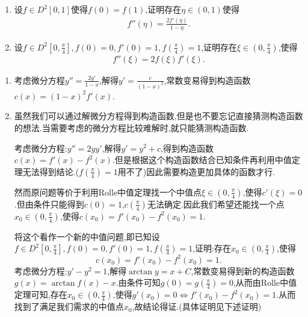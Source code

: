 \documentclass[../../main.tex]{subfiles}%
\begin{document}
\begin{example}
\begin{enumerate}
\item 设\(f\in D^{2}[0,1]\)使得\(f(0)=f(1)\),证明存在\(\eta\in(0,1)\)使得
\begin{align*}
f''(\eta)=\frac{2f'(\eta)}{1 - \eta}.
\end{align*}

\item 设\(f\in D^{2}[0,\frac{\pi}{4}],f(0)=0,f'(0)=1,f(\frac{\pi}{4})=1\),证明存在\(\xi\in(0,\frac{\pi}{4})\),使得
\begin{align*}
f''(\xi)=2f(\xi)f'(\xi).
\end{align*}
\end{enumerate} 
\end{example}
\begin{remark}
\begin{enumerate}
\item 考虑微分方程\(y'' =\frac{2y'}{1-x}\),解得\(y' =\frac{c}{(1 - x)^2}\),常数变易得到构造函数\(c(x)=(1 - x)^2f'(x)\).

\item 虽然我们可以通过解微分方程得到构造函数,但是也不要忘记直接猜测构造函数的想法.当需要考虑的微分方程比较难解时,就只能猜测构造函数. 

考虑微分方程:$y''=2yy'$,解得$y'=y^2+c$,得到构造函数$c(x)=f'(x)-f^2(x)$.但是根据这个构造函数结合已知条件再利用中值定理无法得到结论.($f(\frac{\pi}{4})=1$用不了)因此需要构造更加具体的函数才行.

然而原问题等价于利用Rolle中值定理找一个中值点$\xi\in (0,\frac{\pi }{4})$,使得$c'(\xi)=0$.但由条件只能得到$c(0)=1$,$c(\frac{\pi}{4})$无法确定.因此我们希望还能找一个点$x_0\in(0,\frac{\pi }{4})$,使得$c(x_0)=f'(x_0)-f^2(x_0)=1$.

将这个看作一个新的中值问题,即已知设\(f\in D^{2}[0,\frac{\pi}{4}],f(0)=0,f'(0)=1,f(\frac{\pi}{4})=1\),证明:存在$x_0\in(0,\frac{\pi }{4})$,使得\[c(x_0)=f'(x_0)-f^2(x_0)=1.\]
考虑微分方程:$y'-y^2=1$,解得$\arctan y=x+C$,常数变易得到新的构造函数$g(x)=\arctan f(x)-x$.由条件可知$g(0)=g(\frac{\pi}{4})=0$,从而由Rolle中值定理可知,存在$x_0\in(0,\frac{\pi}{4})$,使得$g'(x_0)=0\Leftrightarrow f'(x_0)-f^2(x_0)=1$.从而找到了满足我们需求的中值点$x_0$,故结论得证.(具体证明见下述证明)
\end{enumerate}
\end{remark}
\end{document}
